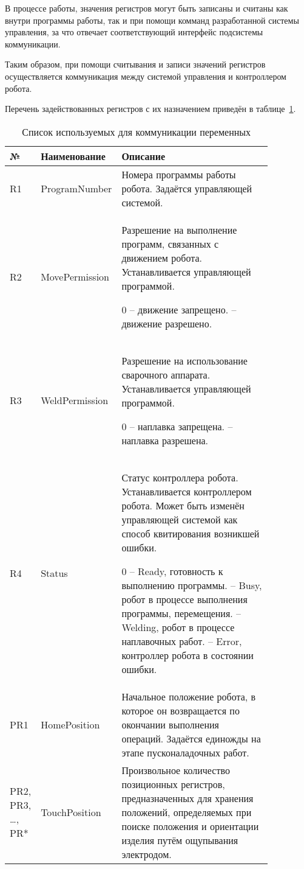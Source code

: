 В процессе работы, значения регистров могут быть записаны и считаны как внутри программы работы, так и при помощи комманд разработанной системы управления, за что отвечает соответствующий интерфейс подсистемы коммуникации.

Таким образом, при помощи считывания и записи значений регистров осуществляется коммуникация между системой управления и контроллером робота.

Перечень задействованных регистров с их назначением приведён в таблице~\ref{tab:VariablesMap}.

\begin{longtable}[H]{|p{0.06\linewidth}|p{0.20\linewidth}|p{0.60\linewidth}|}
    \caption{Список используемых для коммуникации переменных}
    \label{tab:VariablesMap}
    \\ \hline
    № & Наименование & Описание \\ \hline

    R1 & ProgramNumber & Номера программы работы робота.
    Задаётся управляющей системой. \\ \hline

    R2 & MovePermission & Разрешение на выполнение программ, связанных с движением робота.
    Устанавливается управляющей программой. \newline

    0 -- движение запрещено. \newline
    1 -- движение разрешено. \\ \hline

    R3 & WeldPermission & Разрешение на использование сварочного аппарата.
    Устанавливается управляющей программой. \newline

    0 -- наплавка запрещена. \newline
    1 -- наплавка разрешена. \\ \hline

    R4 & Status & Статус контроллера робота.
    Устанавливается контроллером робота.
    Может быть изменён управляющей системой как способ квитирования возникшей ошибки. \newline

    0 -- Ready, готовность к выполнению программы. \newline
    1 -- Busy, робот в процессе выполнения программы, перемещения. \newline
    2 -- Welding, робот в процессе наплавочных работ. \newline
    3 -- Error, контроллер робота в состоянии ошибки. \\ \hline

    PR1 & HomePosition & Начальное положение робота, в которое он возвращается по окончании выполнения операций.
    Задаётся единожды на этапе пусконаладочных работ. \\ \hline

    PR2, PR3, \ldots, PR* & TouchPosition & Произвольное количество позиционных регистров, предназначенных для хранения положений, определяемых при поиске положения и ориентации изделия путём ощупывания электродом. \\ \hline
\end{longtable}

